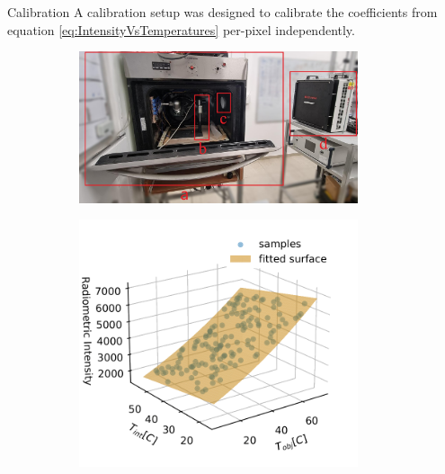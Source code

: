 \begin{frame}{Calibration}
  A calibration setup was designed to calibrate the coefficients from equation \ref{eq:IntensityVsTemperatures} per-pixel independently.
  \begin{figure}
    \begin{subfigure}[b]{0.49\textwidth}
        \centering
        \includegraphics[width=0.9\textwidth]{../figs/methods/calib_setup.jpg}
        \label{fig:calib_setup}
    \end{subfigure}
    \hfill
    \begin{subfigure}[b]{0.49\textwidth}
        \centering
        \includegraphics[width=0.9\textwidth]{../figs/methods/physical_model_tight.png}
        \label{fig:calib_coeffs}
    \end{subfigure}    
  \end{figure}
\end{frame}


